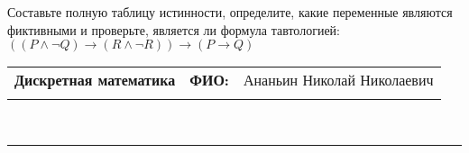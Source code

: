 \documentclass[10pt]{exam}
\newcommand{\class}{Дискретная математика}
\newcommand{\examdate}{}
\begin{document}
\begin{questions}
\begin{enumerate}[a)]
\end{enumerate}\question Составьте полную таблицу истинности, определите, какие переменные являются фиктивными и проверьте, является ли формула тавтологией:
$(( P \land \neg Q) \rightarrow (R \land \neg R)) \rightarrow (P \rightarrow Q)$

\end{questions}
\newpage
\begin{flushright}
\begin{tabular}{p{2.8in} r l}
\textbf{\class} & \textbf{ФИО:} &Ананьин Николай Николаевич
\\

\textbf{\examdate} &&\\
\end{tabular}\\
\end{flushright}
\rule[1ex]{\textwidth}{.1pt}
\end{document}
